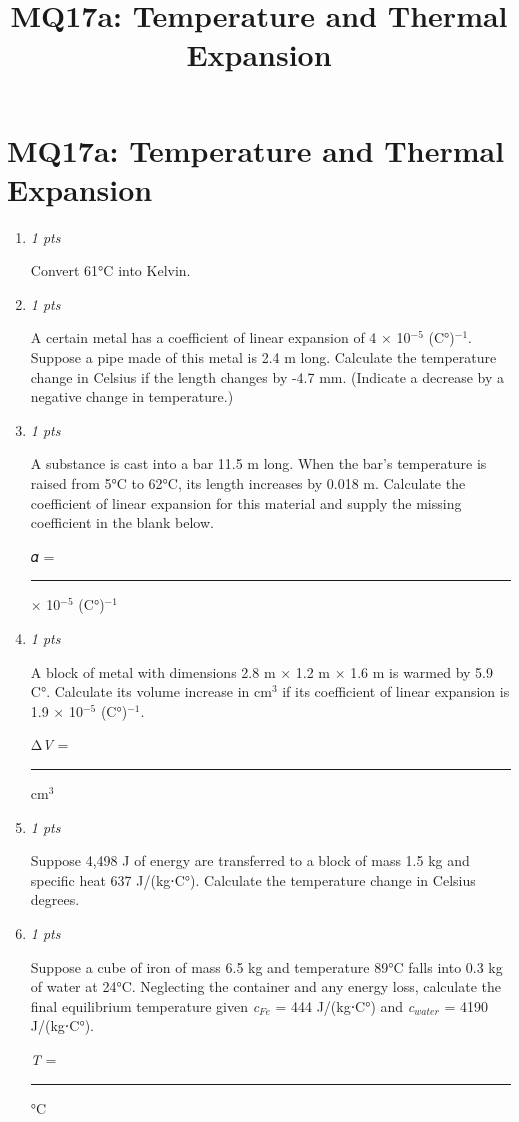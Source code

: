 \documentclass[11pt]{article}
\title{MQ17a: Temperature and Thermal Expansion}
\author{}
\date{}
\begin{document}
\maketitle

\section*{MQ17a: Temperature and Thermal Expansion}

\begin{enumerate}[leftmargin=*,label=\textbf{Question \arabic*.}]

\item \hfill \textit{1 pts}

Convert 61°C into Kelvin.

\item \hfill \textit{1 pts}

A certain metal has a coefficient of linear expansion of 4 × 10$^{-5}$ (C°)$^{-1}$.  Suppose a pipe made of this metal is 2.4 m long. Calculate the temperature change in Celsius if the length changes by -4.7 mm. (Indicate a decrease by a negative change in temperature.)

\item \hfill \textit{1 pts}

A substance is cast into a bar 11.5 m long. When the bar's temperature is raised from 5°C to 62°C, its length increases by 0.018 m. Calculate the coefficient of linear expansion for this material and supply the missing coefficient in the blank below.



𝛼 = \rule{2.5cm}{0.4pt} × 10$^{-5}$ (C°)$^{-1}$

\item \hfill \textit{1 pts}

A block of metal with dimensions 2.8 m × 1.2 m × 1.6 m is warmed by 5.9 C°. Calculate its volume increase in cm$^{3}$ if its coefficient of linear expansion is 1.9 × 10$^{-5}$ (C°)$^{-1}$.



Δ\emph{V} = \rule{2.5cm}{0.4pt} cm$^{3}$

\item \hfill \textit{1 pts}

Suppose 4,498 J of energy are transferred to a block of mass 1.5 kg and specific heat 637 J/(kg⋅C°). Calculate the temperature change in Celsius degrees.

\item \hfill \textit{1 pts}

Suppose a cube of iron of mass 6.5 kg and temperature 89°C falls into 0.3 kg of water at 24°C. Neglecting the container and any energy loss, calculate the final equilibrium temperature given \emph{c}$_{Fe}$ = 444 J/(kg⋅C°) and \emph{c}$_{water}$ = 4190 J/(kg⋅C°).



\emph{T} = \rule{2.5cm}{0.4pt} °C

\end{enumerate}
\end{document}
